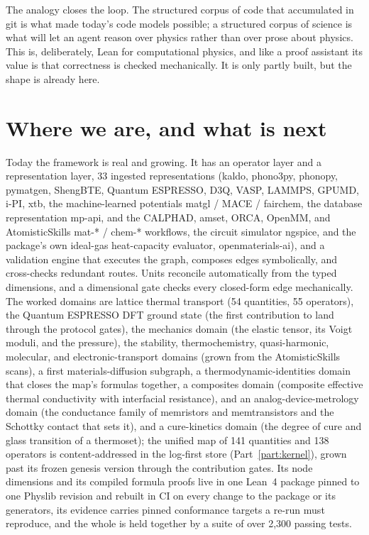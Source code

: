 \documentclass[11pt,a4paper]{article}
\begin{document}
The analogy closes the loop. The structured corpus of code that accumulated in git
is what made today's code models possible; a structured corpus of science is what
will let an agent reason over physics rather than over prose about physics. This
is, deliberately, Lean for computational physics, and like a proof assistant its
value is that correctness is checked mechanically. It is only partly built, but the
shape is already here.

\section{Where we are, and what is next}

Today the framework is real and growing. It has an operator layer and a
representation layer, 33 ingested representations (kaldo, phono3py, phonopy,
pymatgen, ShengBTE, Quantum ESPRESSO, D3Q, VASP, LAMMPS, GPUMD, i-PI, xtb, the
machine-learned potentials matgl / MACE / fairchem, the database representation mp-api,
and the CALPHAD, amset, ORCA, OpenMM, and AtomisticSkills mat-* / chem-*
workflows, the circuit simulator ngspice, and the package's own ideal-gas
heat-capacity evaluator, openmaterials-ai), and a
validation engine that executes the graph, composes
edges symbolically, and cross-checks redundant routes. Units reconcile
automatically from the typed dimensions, and a dimensional gate checks every
closed-form edge mechanically. The worked domains are lattice thermal
transport (54 quantities, 55 operators), the Quantum ESPRESSO DFT ground
state (the first contribution to land through the protocol gates), the
mechanics domain (the elastic tensor, its Voigt moduli, and the pressure), the
stability, thermochemistry, quasi-harmonic, molecular, and electronic-transport
domains (grown from the AtomisticSkills scans),
a first materials-diffusion subgraph, a thermodynamic-identities domain that
closes the map's formulas together, a composites domain (composite effective
thermal conductivity with interfacial resistance), and an analog-device-metrology
domain (the conductance family of memristors and memtransistors and the Schottky
contact that sets it), and a cure-kinetics domain (the degree of cure and glass
transition of a thermoset); the unified map of
141 quantities and 138 operators is content-addressed in the log-first store
(Part~\ref{part:kernel}), grown past its frozen genesis version through the
contribution gates. Its node dimensions and its compiled formula proofs live in one Lean~4 package
pinned to one Physlib revision and rebuilt in CI on every change to the package or its generators, its evidence carries pinned conformance
targets a re-run must reproduce, and the whole is held together by a suite of
over 2,300 passing tests.
\end{document}
